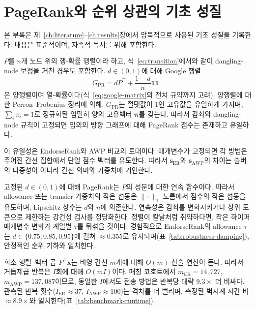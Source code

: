 \section{PageRank와 순위 상관의 기초 성질}
\label{ch:appendix-theory}

본 부록은 제~\ref{ch:literature}--\ref{ch:results}장에서 암묵적으로 사용된 기초 성질을 기록한다. 내용은 표준적\citep{49,40,54,36}이며, 자족적 독서를 위해 포함한다.


$P$를 $n$개 노드 위의 행-확률 행렬이라 하고, 식~\eqref{eq:transition}에서와 같이 dangling-node 보정을 거친 경우도 포함한다. $d\in(0,1)$에 대해 Google 행렬
\[
G_{\mathrm{PR}}=d P^{\top}+\frac{1-d}{n}\mathbf{1}\mathbf{1}^{\top}
\]
은 양행렬이며 열-확률이다(식~\eqref{eq:google-matrix}의 전치 규약까지 고려). 양행렬에 대한 Perron--Frobenius 정리에 의해, $G_{\mathrm{PR}}$는 절댓값이 1인 고유값을 유일하게 가지며, $\sum_i\pi_i=1$로 정규화된 엄밀히 양의 고유벡터 $\boldsymbol{\pi}$를 갖는다. 따라서 감쇠와 dangling-node 규칙이 고정되면 임의의 방향 그래프에 대해 PageRank 점수는 존재하고 유일하다\citep{40}.

이 유일성은 EndorseRank와 AWP 비교의 토대이다. 매개변수가 고정되면 각 방법은 주어진 간선 집합에서 단일 점수 벡터를 유도한다. 따라서 $\mathbf{s}_{\mathrm{ER}}$와 $\mathbf{s}_{\mathrm{AWP}}$의 차이는 솔버의 다중성이 아니라 간선 의미와 가중치에 기인한다.


고정된 $d\in(0,1)$에 대해 PageRank는 $P$의 성분에 대한 연속 함수이다. 따라서 allowance 또는 transfer 가중치의 작은 섭동은 $\|\cdot\|_1$ 노름에서 점수의 작은 섭동을 유도하며, Lipschitz 상수는 $d$와 $n$에 의존한다\citep{40}. 연속성은 감쇠를 변화시키거나 상위 토큰으로 제한하는 강건성 검사를 정당화한다. 정렬이 칼날처럼 취약하다면, 작은 하이퍼매개변수 변화가 계열별 $\tau$를 뒤섞을 것이다. 경험적으로 EndorseRank의 allowance $\tau$는 $d\in\{0.75,0.85,0.95\}$에 걸쳐 $\approx 0.355$로 유지되며(표~\ref{tab:robustness-damping}), 안정적인 순위 기하와 일치한다.


희소 행렬--벡터 곱 $P^{\top}\mathbf{x}$는 비영 간선 $m$개에 대해 $O(m)$ 산술 연산이 든다. 따라서 거듭제곱 반복은 $I$회에 대해 $O(mI)$이다. 매칭 코호트에서 $m_{\mathrm{ER}}=14{,}727$, $m_{\mathrm{AWP}}=137{,}087$이므로, 동일한 $I$에서도 전송 방법은 반복당 대략 $9.3\times$ 더 비싸다. 관측된 반복 횟수($I_{\mathrm{ER}}\approx 37$, $I_{\mathrm{AWP}}\approx 100$)는 격차를 더 벌리며, 측정된 벽시계 시간 비 $\approx 8.9\times$와 일치한다(표~\ref{tab:benchmark-runtime}).

